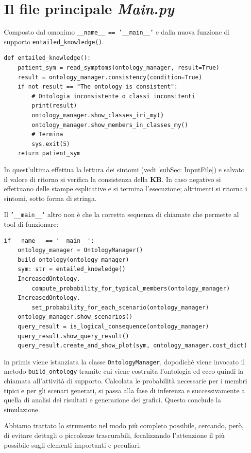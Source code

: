 \section{Il file principale \emph{Main.py}}
Composto  dal omonimo \texttt{__name__ == '__main__'} e dalla nuova funzione di 
supporto \texttt{entailed_knowledge()}.
\begin{verbatim}
def entailed_knowledge():
	patient_sym = read_symptoms(ontology_manager, result=True)
	result = ontology_manager.consistency(condition=True)
	if not result == "The ontology is consistent":
		# Ontologia inconsistente o classi inconsitenti
		print(result)
		ontology_manager.show_classes_iri_my()
		ontology_manager.show_members_in_classes_my()
		# Termina
		sys.exit(5)
	return patient_sym
\end{verbatim}
In quest'ultima effettua la lettura dei sintomi (vedi \ref{subSec: InputFile}) e salvato il
valore di ritorno si verifica la consistenza della \textbf{KB}. In caso negativo si effettuano delle stampe esplicative e si termina l'esecuzione; altrimenti si ritorna i sintomi, sotto forma di stringa.
                
Il \texttt{'__main__'} altro non è che la corretta sequenza di chiamate che 
permette al tool di funzionare: 
\begin{verbatim}
if __name__ == '__main__':
	ontology_manager = OntologyManager()
	build_ontology(ontology_manager)
	sym: str = entailed_knowledge()
	IncreasedOntology.
		compute_probability_for_typical_members(ontology_manager)
	IncreasedOntology.
		set_probability_for_each_scenario(ontology_manager)
	ontology_manager.show_scenarios()
	query_result = is_logical_consequence(ontology_manager)
	query_result.show_query_result()
	query_result.create_and_show_plot(sym, ontology_manager.cost_dict)
\end{verbatim}
in primis viene istanziata la classe \texttt{OntologyManager}, 
dopodichè viene invocato il metodo \texttt{build_ontology} tramite cui viene costruita l'ontologia ed ecco quindi la chiamata all'attività di supporto.
Calcolata le probabilità necessarie per i membri tipici e per gli scenari generati, si passa
alla fase di inferenza e successivamente a quella di analisi dei risultati e generazione dei
grafici. Questo conclude la simulazione.

Abbiamo trattato lo strumento nel modo più completo possibile, cercando, però, di evitare
dettagli o piccolezze trascurabili, focalizzando l'attenzione il più possibile sugli
elementi importanti e peculiari.

                                                            

